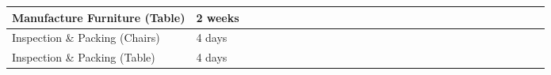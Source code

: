 \begin{table}[!h]
{\begin{tabular}{|l|l|l|l|l|l|l|l|l|l|l|l|l|l|l|l|l|l|l|l|l|l|l|l|l|l|l|l|l|}
            Manufacture Furniture (Table)    & 2 weeks &                          &                          &                          &                          &                          &                          &                          &                          &                          &                          &                          &                          &                          &                          &                          &                          &                          & \cellcolor[HTML]{FD6864} & \cellcolor[HTML]{FD6864} & \cellcolor[HTML]{FD6864} &                          &                          &                          &                          &                          &                          &                          \\ \hline
            Inspection \& Packing (Chairs)   & 4 days  &                          &                          &                          &                          &                          &                          &                          &                          &                          &                          &                          &                          &                          &                          &                          &                          &                          &                          &                          &                          & \cellcolor[HTML]{FD6864} & \cellcolor[HTML]{FD6864} &                          &                          &                          &                          &                          \\ \hline
            Inspection \& Packing (Table)    & 4 days  &                          &                          &                          &                          &                          &                          &                          &                          &                          &                          &                          &                          &                          &                          &                          &                          &                          &                          &                          &                          & \cellcolor[HTML]{FD6864} & \cellcolor[HTML]{FD6864} &                          &                          &                          &                          &                          \\ \hline

\end{tabular}}
\end{table}
